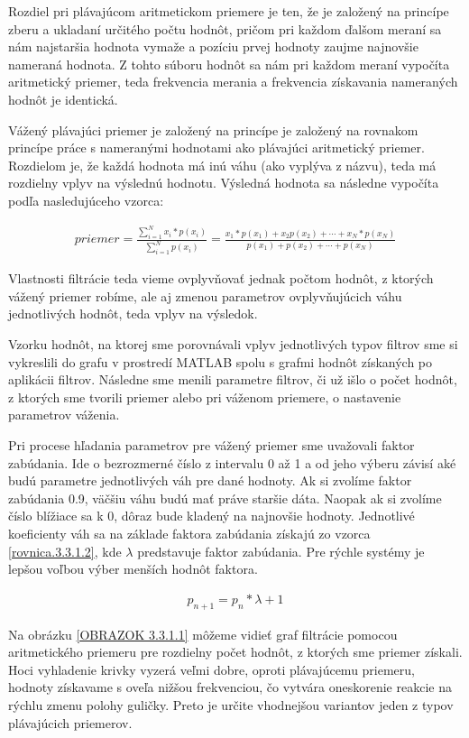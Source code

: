 Rozdiel pri plávajúcom aritmetickom priemere je ten, že je založený na princípe zberu a ukladaní určitého počtu hodnôt, pričom pri každom ďalšom meraní sa nám najstaršia hodnota vymaže a pozíciu prvej hodnoty zaujme najnovšie nameraná hodnota. Z tohto súboru hodnôt sa nám pri každom meraní vypočíta aritmetický priemer, teda frekvencia merania a frekvencia získavania nameraných hodnôt je identická.

Vážený plávajúci priemer je založený na princípe je založený na rovnakom princípe práce s nameranými hodnotami ako plávajúci aritmetický priemer. Rozdielom je, že každá hodnota má inú váhu (ako vyplýva z názvu), teda má rozdielny vplyv na výslednú hodnotu.  Výsledná hodnota sa následne vypočíta podľa nasledujúceho vzorca:



\begin{align}
	\label{rovnica.3.3.1.1}
	priemer =\frac{\sum_{i=1}^{N}x_i*p(x_i)}{\sum_{i=1}^{N}p(x_i)} = \frac{ x_1*p(x_1)+x_2p(x_2)+\cdots +x_N*p(x_N)}{ p(x_1)+p(x_2)+\cdots +p(x_N)}
\end{align}

Vlastnosti filtrácie teda vieme ovplyvňovať jednak počtom hodnôt, z ktorých vážený priemer robíme, ale aj zmenou parametrov ovplyvňujúcich váhu jednotlivých hodnôt, teda vplyv na výsledok.

Vzorku hodnôt, na ktorej sme porovnávali vplyv jednotlivých typov filtrov sme si vykreslili do grafu v prostredí MATLAB spolu s grafmi hodnôt získaných po aplikácii filtrov. Následne sme menili parametre filtrov, či už išlo o počet hodnôt, z ktorých sme tvorili priemer alebo pri váženom priemere, o nastavenie parametrov váženia.

Pri procese hľadania parametrov pre vážený priemer sme uvažovali faktor zabúdania. Ide o bezrozmerné číslo z intervalu 0 až 1 a od jeho výberu závisí aké budú parametre jednotlivých váh pre dané hodnoty. Ak si zvolíme faktor zabúdania 0.9, väčšiu váhu budú mať práve staršie dáta. Naopak ak si zvolíme číslo blížiace sa k 0, dôraz bude kladený na najnovšie hodnoty. Jednotlivé koeficienty váh sa na základe faktora zabúdania získajú zo vzorca  \ref{rovnica.3.3.1.2}, kde $\lambda$ predstavuje faktor zabúdania. Pre rýchle systémy je lepšou voľbou výber menších hodnôt faktora.

\begin{align}
	\label{rovnica.3.3.1.2}
	p_{n+1} = p_n*\lambda+1
\end{align}


Na obrázku \ref{OBRAZOK 3.3.1.1} môžeme vidieť graf filtrácie pomocou aritmetického priemeru pre rozdielny počet hodnôt, z ktorých sme priemer získali.  Hoci vyhladenie krivky vyzerá veľmi dobre, oproti plávajúcemu priemeru, hodnoty získavame s oveľa nižšou frekvenciou, čo vytvára oneskorenie reakcie na rýchlu zmenu polohy guličky. Preto je určite vhodnejšou variantov jeden z typov plávajúcich priemerov.

